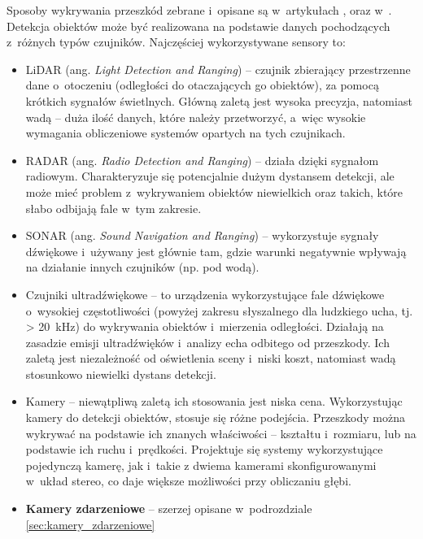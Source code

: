 Sposoby wykrywania przeszkód zebrane i~opisane są w~artykułach \cite{detection_techniques}, \cite{detection_methods} oraz w~\cite{detection_methods2}. Detekcja obiektów może być realizowana na podstawie danych pochodzących z~różnych typów czujników. Najczęściej wykorzystywane sensory to:
\begin{itemize}
    \item LiDAR (ang. \textit{Light Detection and Ranging}) -- czujnik zbierający przestrzenne dane o~otoczeniu (odległości do otaczających go obiektów), za pomocą krótkich sygnałów świetlnych. Główną zaletą jest wysoka precyzja, natomiast wadą -- duża ilość danych, które należy przetworzyć, a~więc wysokie wymagania obliczeniowe systemów opartych na tych czujnikach.
    \item RADAR (ang. \textit{Radio Detection and Ranging}) -- działa dzięki sygnałom radiowym. Charakteryzuje się potencjalnie dużym dystansem detekcji, ale może mieć problem z~wykrywaniem obiektów niewielkich oraz takich, które słabo odbijają fale w~tym zakresie.
    \item SONAR (ang. \textit{Sound Navigation and Ranging}) -- wykorzystuje sygnały dźwiękowe i~używany jest głównie tam, gdzie warunki negatywnie wpływają na działanie innych czujników (np. pod wodą).
    \item Czujniki ultradźwiękowe -- to urządzenia wykorzystujące fale dźwiękowe o~wysokiej częstotliwości (powyżej zakresu słyszalnego dla ludzkiego ucha, tj. > \SI{20}{kHz}) do wykrywania obiektów i~mierzenia odległości. Działają na zasadzie emisji ultradźwięków i~analizy echa odbitego od przeszkody. Ich zaletą jest niezależność od oświetlenia sceny i~niski koszt, natomiast wadą stosunkowo niewielki dystans detekcji.
    \item Kamery -- niewątpliwą zaletą ich stosowania jest niska cena. %
    Wykorzystując kamery do detekcji obiektów, stosuje się różne podejścia. Przeszkody można wykrywać na podstawie ich znanych właściwości -- kształtu i~rozmiaru, lub na podstawie ich ruchu i~prędkości. Projektuje się systemy wykorzystujące pojedynczą kamerę, jak i~takie z dwiema kamerami skonfigurowanymi w~układ stereo, co daje większe możliwości przy obliczaniu głębi.
    \item \textbf{Kamery zdarzeniowe} -- szerzej opisane w~podrozdziale \ref{sec:kamery_zdarzeniowe}
\end{itemize}

